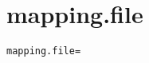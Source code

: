 \section{mapping.file}
\label{configuration:MappingFile}
\ClearAPI
\TODO
{}
\begin{lstlisting}[style=Props,caption={Usage example for \textit{mapping.file}}]
mapping.file=
\end{lstlisting}